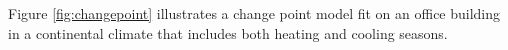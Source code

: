 Figure \ref{fig:changepoint} illustrates a change point model fit on an office building in a continental climate that includes both heating and cooling seasons.